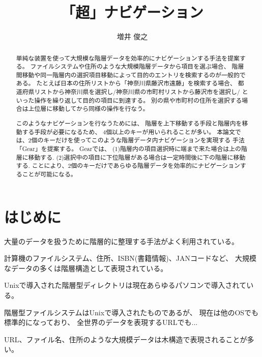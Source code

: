 \documentclass[twoside]{wiss}
\begin{document}
\title{「超」ナビゲーション}
\etitle{} %

\author{増井 俊之}

\begin{abstract}
単純な装置を使って大規模な階層データを効率的にナビゲーションする手法を提案する。
%
ファイルシステムや住所のような大規模階層データから項目を選ぶ場合、
階層間移動や同一階層内の選択項目移動によって目的のエントリを検索するのが一般的である。
たとえば日本の住所リストから「神奈川県藤沢市遠藤」を検索する場合、
都道府県リストから神奈川県を選択し/神奈川県の市町村リストから藤沢市を選択し/
といった操作を繰り返して目的の項目に到達する。
別の県や市町村の住所を選択する場合は上位層に移動してから同様の操作を行なう。

このようなナビゲーションを行なうためには、
階層を上下移動する手段と階層内を移動する手段が必要になるため、
4個以上のキーが用いられることが多い。
本論文では、2個のキーだけを使ってこのような階層データ内ナビゲーションを実現する
手法「Gear」を提案する。
Gearでは、
(1)階層内の項目選択時に端まで来た場合は上の階層に移動する.
(2)選択中の項目に下位階層がある場合は一定時間後に下の階層に移動する.
ことにより、2個のキーだけであらゆる階層データを効率的にナビゲーションすることが可能になる。
\end{abstract}

\maketitle

\section{はじめに}

大量のデータを扱うために階層的に整理する手法がよく利用されている。

計算機のファイルシステム、住所、ISBN(書籍情報)、JANコードなど、
大規模なデータの多くは階層構造として表現されている。

Unixで導入された階層型ディレクトリは現在あらゆるパソコンで導入されている。

階層型ファイルシステムはUnixで導入されたものであるが、
現在は他のOSでも標準的になっており、
全世界のデータを表現するURLでも...

URL、ファイル名、住所のような大規模データは木構造で表現されることが多い。
\end{document}

